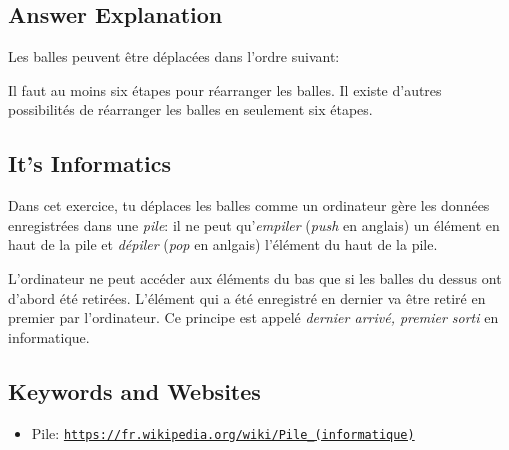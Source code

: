 \documentclass[a4paper,11pt]{report}
\newcommand{\BrochureUrlText}[1]{\texttt{#1}}
\newcommand{\taskGraphicsFolder}{..}
\begin{document}
\endgroup

\subsection*{Answer Explanation}

Les balles peuvent être déplacées dans l’ordre suivant:

{\centering%
\par}

Il faut au moins six étapes pour réarranger les balles. Il existe d’autres possibilités de réarranger les balles en seulement six étapes.


\subsection*{It’s Informatics}

Dans cet exercice, tu déplaces les balles comme un ordinateur gère les données enregistrées dans une \emph{pile}: il ne peut qu’\emph{empiler} (\emph{push} en anglais) un élément en haut de la pile et \emph{dépiler} (\emph{pop} en anlgais) l’élément du haut de la pile.

{\centering%
\par}

L’ordinateur ne peut accéder aux éléments du bas que si les balles du dessus ont d’abord été retirées. L’élément qui a été enregistré en dernier va être retiré en premier par l’ordinateur. Ce principe est appelé \emph{dernier arrivé, premier sorti} en informatique.

{\raggedright

\subsection*{Keywords and Websites}

\begin{itemize}
  \item Pile: \href{https://fr.wikipedia.org/wiki/Pile_(informatique)}{\BrochureUrlText{https://fr.wikipedia.org/wiki/Pile\_(informatique)}}
\end{itemize}


}
\end{document}
